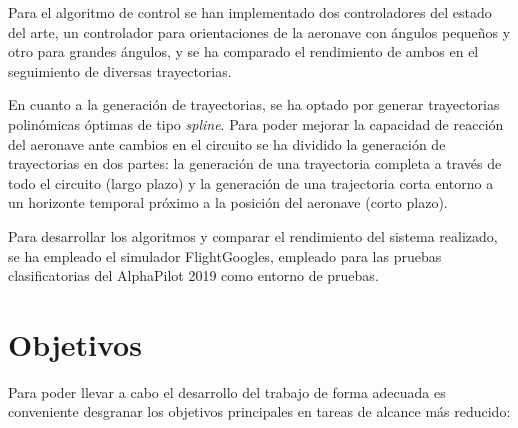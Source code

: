 Para el algoritmo de control se han implementado dos controladores del estado del arte, un controlador para orientaciones de la aeronave con ángulos pequeños y otro para grandes ángulos, y se ha comparado el rendimiento de ambos en el seguimiento de diversas trayectorias.

En cuanto a la generación de trayectorias, se ha optado por generar trayectorias polinómicas óptimas de tipo \textit{spline}. Para poder mejorar la capacidad de reacción del aeronave ante cambios en el circuito se ha dividido la  generación de trayectorias en dos partes: la generación de una trayectoria completa a través de todo el circuito (largo plazo) y la generación de una trajectoria corta entorno a un horizonte temporal próximo a la posición del aeronave (corto plazo).

Para desarrollar los algoritmos y comparar el rendimiento del sistema realizado, se ha empleado el simulador FlightGoogles, empleado para las pruebas clasificatorias del AlphaPilot 2019 como entorno de pruebas.



\section{Objetivos}

Para poder llevar a cabo el desarrollo del trabajo de forma adecuada es conveniente desgranar los objetivos principales en tareas de alcance más reducido:

